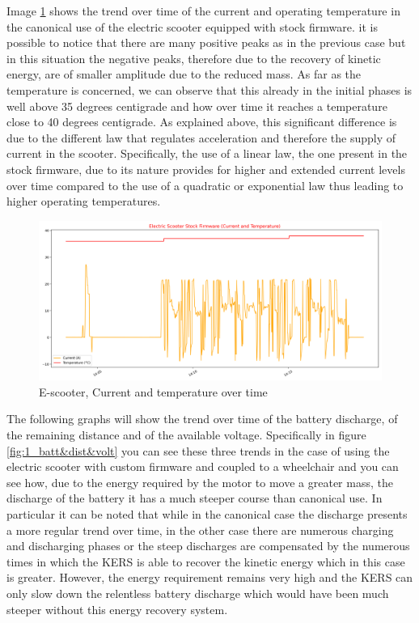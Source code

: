 \documentclass[binding=0.6cm,LaM,noexaminfo]{sapthesis}
\begin{document}
\noindent Image \ref{fig:2_curr&temp} shows the trend over time of the current and operating temperature in the canonical use of the electric scooter equipped with stock firmware. it is possible to notice that there are many positive peaks as in the previous case but in this situation the negative peaks, therefore due to the recovery of kinetic energy, are of smaller amplitude due to the reduced mass. As far as the temperature is concerned, we can observe that this already in the initial phases is well above 35 degrees centigrade and how over time it reaches a temperature close to 40 degrees centigrade. As explained above, this significant difference is due to the different law that regulates acceleration and therefore the supply of current in the scooter. Specifically, the use of a linear law, the one present in the stock firmware, due to its nature provides for higher and extended current levels over time compared to the use of a quadratic or exponential law thus leading to higher operating temperatures.

\begin{figure}[!htp]
    \centering
    \includegraphics[width=.9\textwidth]{images/graphs/2_curr+temp.png}
    \caption{ E-scooter, Current and temperature over time}
    \label{fig:2_curr&temp}
\end{figure}

\noindent The following graphs will show the trend over time of the battery discharge, of the remaining distance and of the available voltage. Specifically in figure \ref{fig:1_batt&dist&volt} you can see these three trends in the case of using the electric scooter with custom firmware and coupled to a wheelchair and you can see how, due to the energy required by the motor to move a greater mass, the discharge of the battery it has a much steeper course than canonical use. In particular it can be noted that while in the canonical case the discharge presents a more regular trend over time, in the other case there are numerous charging and discharging phases or the steep discharges are compensated by the numerous times in which the KERS is able to recover the kinetic energy which in this case is greater. However, the energy requirement remains very high and the KERS can only slow down the relentless battery discharge which would have been much steeper without this energy recovery system.
\end{document}
